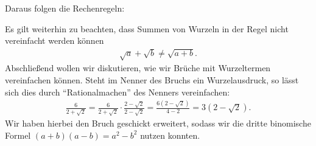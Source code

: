 Daraus folgen die Rechenregeln:
\begin{mymathbox}[ams align, title={Wurzelgesetze}, colframe={FSUblau}]
\end{mymathbox}
Es gilt weiterhin zu beachten, dass Summen von Wurzeln in der Regel nicht vereinfacht werden können 
\begin{align}
    \sqrt{a} + \sqrt{b} \neq \sqrt{a+b}.
\end{align}
Abschließend wollen wir diskutieren, wie wir Brüche mit Wurzeltermen vereinfachen können. Steht im Nenner des Bruchs ein Wurzelausdruck, so lässt sich dies durch ``Rationalmachen'' des Nenners vereinfachen: 
\begin{align}
    \frac{6}{2+\sqrt{2}} = \frac{6}{2+\sqrt{2}}\cdot\frac{2-\sqrt{2}}{2-\sqrt{2}} = \frac{6(2-\sqrt{2})}{4-2} = 3(2-\sqrt{2}).
\end{align}
Wir haben hierbei den Bruch geschickt erweitert, sodass wir die dritte binomische Formel $(a+b)(a-b) = a^2-b^2$ nutzen konnten.


